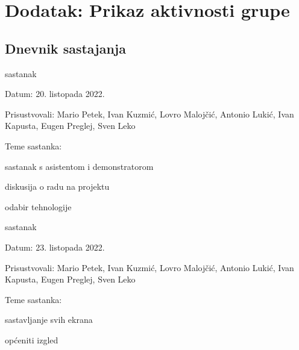 \chapter*{Dodatak: Prikaz aktivnosti grupe}
		
		\section*{Dnevnik sastajanja}
		
		
		
		\begin{packed_enum}
			\item  sastanak
			\item[] \begin{packed_item}
				\item Datum: 20. listopada 2022.
				\item Prisustvovali: Mario Petek, Ivan Kuzmić, Lovro Malojčić, Antonio Lukić, Ivan Kapusta, Eugen Preglej, Sven Leko
				\item Teme sastanka:
				\begin{packed_item}
					\item  sastanak s asistentom i demonstratorom
					\item  diskusija o radu na projektu
					\item  odabir tehnologije
				\end{packed_item}
			\end{packed_item}
			
			\item  sastanak
			\item[] \begin{packed_item}
				\item Datum: 23. listopada 2022.
				\item Prisustvovali: Mario Petek, Ivan Kuzmić, Lovro Malojčić, Antonio Lukić, Ivan Kapusta, Eugen Preglej, Sven Leko
				\item Teme sastanka:
				\begin{packed_item}
					\item  sastavljanje svih ekrana
					\item  općeniti izgled
				\end{packed_item}
			\end{packed_item}
		

\end{packed_enum}
